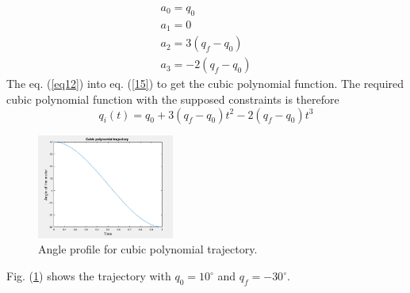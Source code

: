 \begin{equation} \label{15}
    \begin{split}
        a_0 = q_0 \\
        a_1 = 0 \\
        a_2 = 3(q_f - q_0 ) \\
        a_3 = -2(q_f - q_0)
    \end{split}
\end{equation}
The eq. (\ref{eq12}) into eq. (\ref{15}) to get the cubic polynomial function. The required cubic polynomial function with the supposed constraints is therefore
\begin{equation}
    q_i(t) = q_0 + 3(q_f - q_0)t^2 - 2(q_f - q_0)t^3
\end{equation}
\begin{figure}[H]
    \centering
    \includegraphics[width=0.4\textwidth]{sections/assets/cubic.png}
    \caption{Angle profile for cubic polynomial trajectory.}
    \label{fig2}
\end{figure}
Fig. (\ref{fig2}) shows the trajectory with $q_0 = 10^\circ$ and $q_f = -30^\circ$.

